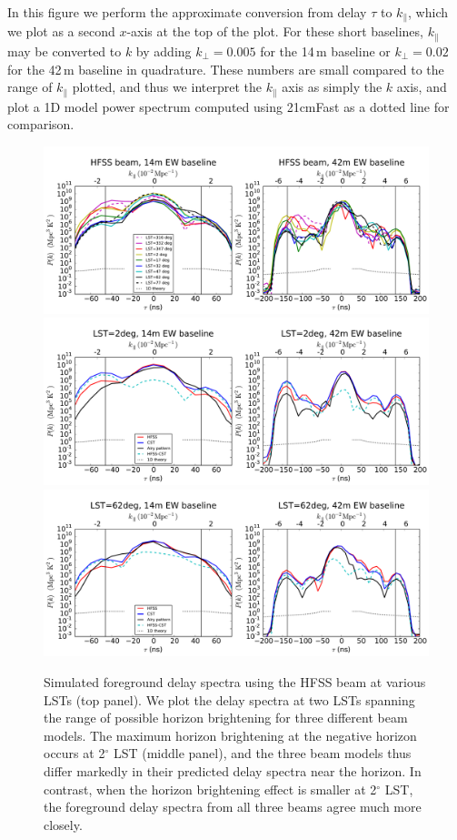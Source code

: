 \documentclass{emulateapj}
\begin{document}
In this figure we perform the approximate conversion from delay $\tau$ to $k_\parallel$, which we plot as a second $x$-axis at the top of the plot. For these short baselines, $k_\parallel$ may be converted to $k$ by adding $k_\perp=0.005$ for the 14\,m baseline or $k_\perp=0.02$ for the 42\,m baseline in quadrature. These numbers are small compared to the range of $k_\parallel$ plotted, and thus we interpret the $k_\parallel$ axis as simply the $k$ axis, and plot a 1D model power spectrum computed using 21cmFast \citep{21cmfast} as a dotted line for comparison. 

\begin{figure}[h]
\centering
\includegraphics[width=6in]{delay_spectra_dave_rich_airy_beams_manyLSTs.pdf}
\includegraphics[width=6in]{delay_spectra_dave_rich_airy_beams_LST2deg.pdf}
\includegraphics[width=6in]{delay_spectra_dave_rich_airy_beams_LST62deg.pdf}
\caption{Simulated foreground delay spectra using the HFSS beam at various LSTs (top panel). We plot the delay spectra at two LSTs spanning the range of possible horizon brightening for three different beam models. The maximum horizon brightening at the negative horizon occurs at 2$^\circ$ LST (middle panel), and the three beam models thus differ markedly in their predicted delay spectra near the horizon. In contrast, when the horizon brightening effect is smaller at 2$^\circ$ LST, the foreground delay spectra from all three beams agree much more closely.}
\label{fig:delayspec}
\end{figure}
\end{document}
